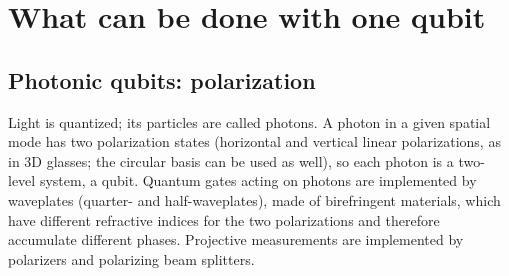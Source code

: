 \chapter{What can be done with one qubit}\label{ch:applications1}

\section{Photonic qubits: polarization}\label{sec:photonic}
Light is quantized; its particles are called photons. A photon in a given spatial mode has two polarization states (horizontal and vertical
linear polarizations, as in 3D glasses; the circular basis can be used as well), so each photon is a two-level system, a qubit. Quantum gates
acting on photons are implemented by waveplates (quarter- and half-waveplates), made of birefringent materials, which have different
refractive indices for the two polarizations and therefore accumulate different phases. Projective measurements are implemented by
polarizers and polarizing beam splitters.

